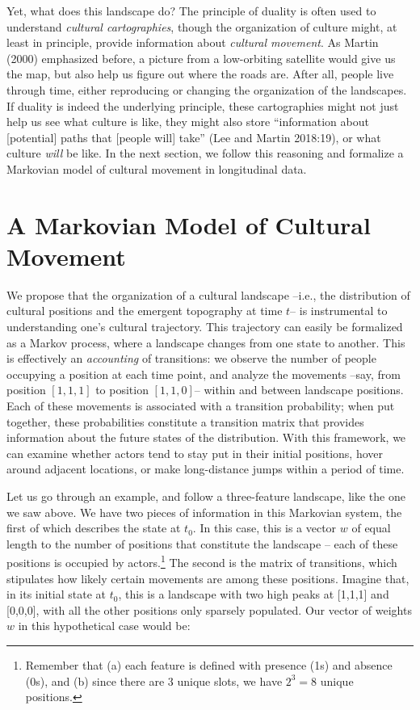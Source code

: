 \documentclass[
  11pt,
]{article}
\begin{document}
Yet, what does this landscape do? The principle of duality is often used
to understand \emph{cultural cartographies}, though the organization of
culture might, at least in principle, provide information about
\emph{cultural movement}. As Martin (2000) emphasized before, a picture
from a low-orbiting satellite would give us the map, but also help us
figure out where the roads are. After all, people live through time,
either reproducing or changing the organization of the landscapes. If
duality is indeed the underlying principle, these cartographies might
not just help us see what culture is like, they might also store
``information about {[}potential{]} paths that {[}people will{]} take''
(Lee and Martin 2018:19), or what culture \emph{will} be like. In the
next section, we follow this reasoning and formalize a Markovian model
of cultural movement in longitudinal data.

\hypertarget{a-markovian-model-of-cultural-movement}{%
\section{A Markovian Model of Cultural
Movement}\label{a-markovian-model-of-cultural-movement}}

We propose that the organization of a cultural landscape --i.e., the
distribution of cultural positions and the emergent topography at time
\(t\)-- is instrumental to understanding one's cultural trajectory. This
trajectory can easily be formalized as a Markov process, where a
landscape changes from one state to another. This is effectively an
\emph{accounting} of transitions: we observe the number of people
occupying a position at each time point, and analyze the movements
--say, from position \([1,1,1]\) to position \([1,1,0]\)-- within and
between landscape positions. Each of these movements is associated with
a transition probability; when put together, these probabilities
constitute a transition matrix that provides information about the
future states of the distribution. With this framework, we can examine
whether actors tend to stay put in their initial positions, hover around
adjacent locations, or make long-distance jumps within a period of time.

Let us go through an example, and follow a three-feature landscape, like
the one we saw above. We have two pieces of information in this
Markovian system, the first of which describes the state at \(t_0\). In
this case, this is a vector \(w\) of equal length to the number of
positions that constitute the landscape -- each of these positions is
occupied by actors.\footnote{Remember that (a) each feature is defined
  with presence (1s) and absence (0s), and (b) since there are 3 unique
  slots, we have \(2^3 = 8\) unique positions.} The second is the matrix
of transitions, which stipulates how likely certain movements are among
these positions. Imagine that, in its initial state at \(t_0\), this is
a landscape with two high peaks at {[}1,1,1{]} and {[}0,0,0{]}, with all
the other positions only sparsely populated. Our vector of weights \(w\)
in this hypothetical case would be:
\end{document}
